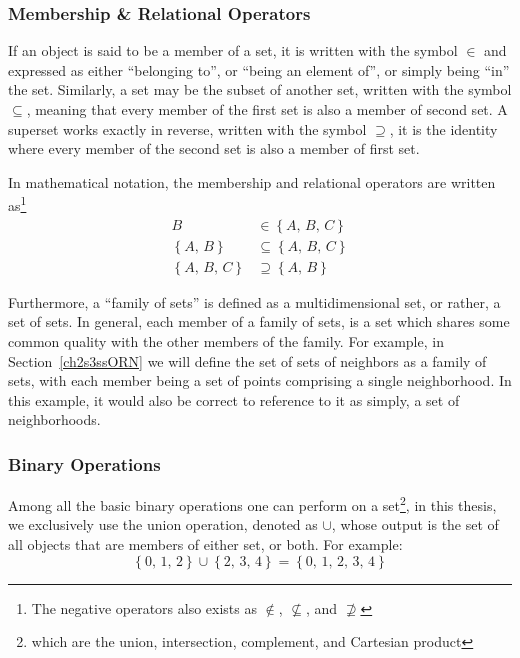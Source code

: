 %
%
\subsubsection{Membership \& Relational Operators}
\label{ch2sETBssSTsssMRO}
If an object is said to be a member of a set, it is written with the symbol $\in$ and expressed as either ``belonging to'', or ``being an element of'', or simply being ``in'' the set. Similarly, a set may be the subset of another set, written with the symbol $\subseteq$, meaning that every member of the first set is also a member of second set. A superset works exactly in reverse, written with the symbol $\supseteq$, it is the identity where every member of the second set is also a member of first set.

In mathematical notation, the membership and relational operators are written as\footnote{The negative operators also exists as $\notin$, $\nsubseteq$, and  $\nsupseteq$}
\begin{align}
	B & \in \left \{A,\,B,\,C\right \} \\
	\left \{A,\,B\right \} & \subseteq \left \{A,\,B,\,C\right \} \\
	\left \{A,\,B,\,C\right \} & \supseteq \left \{A,\,B\right \}
\end{align}

Furthermore, a ``family of sets'' is defined as a multidimensional set, or rather, a set of sets. In general, each member of a family of sets, is a set which shares some common quality with the other members of the family. For example, in Section~\ref{ch2s3ssORN} we will define the set of sets of neighbors as a family of sets, with each member being a set of points comprising a single neighborhood. In this example, it would also be correct to reference to it as simply, a set of neighborhoods.

%
%
\subsubsection{Binary Operations}
\label{ch2sETBssSTsssBO}
Among all the basic binary operations one can perform on a set\footnote{which are the union, intersection, complement, and Cartesian product}, in this thesis, we exclusively use the union operation, denoted as $\cup$, whose output is the set of all objects that are members of either set, or both. For example:
%
\begin{equation}
	\left \{0,\,1,\,2\right \} \cup \left \{2,\,3,\,4\right \} = \left \{0,\,1,\,2,\,3,\,4\right \}
\end{equation}

